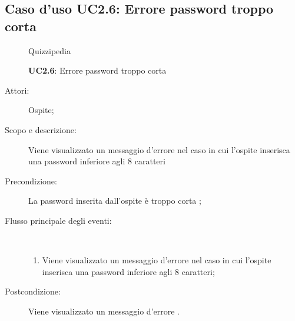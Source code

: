 \subsection{Caso d'uso UC2.6: Errore password troppo corta}
	\begin{figure}[H]
		\centering
		\begin{resizedtikzpicture}{\textwidth}
		\begin{umlsystem}[x=0, fill=lightgray!20]{Quizzipedia}
		\end{umlsystem}
		\end{resizedtikzpicture}
		\caption{\textbf{UC2.6}: Errore password troppo corta}
		\label{UC2.6}
	\end{figure}
\begin{description}
\item[Attori:] Ospite;
\item[Scopo e descrizione:] Viene visualizzato un messaggio d'errore nel caso in cui l'ospite inserisca una password inferiore agli 8 caratteri
      \item[Precondizione:] La password inserita dall'ospite è troppo corta
;

        \item[Flusso principale degli eventi:] \ 
 \begin{enumerate}
          \item Viene visualizzato un messaggio d'errore nel caso in cui l'ospite inserisca una password inferiore agli 8 caratteri;

      \end{enumerate}
    \item[Postcondizione:] Viene visualizzato un messaggio d'errore
.
  \end{description}
\hypertarget{UC2.7}{}
